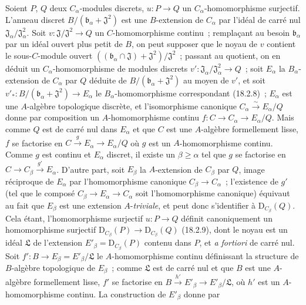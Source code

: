 \begin{env}[19.5.6.1]
\label{0.19.5.6.1-fr}
Soient $P$, $Q$ deux $C_\alpha$-modules discrets,
$u:P\to Q$ un $C_\alpha$-homomorphisme surjectif. L'anneau discret
$B/(\mathfrak b_\alpha+\mathfrak J^2)$ est une $B$-extension de $C_\alpha$ par
l'idéal de carré nul $\mathfrak J_\alpha/\mathfrak J_\alpha^2$. Soit
$v:\mathfrak J/\mathfrak J^2\to Q$ un $C$-homomorphisme continu~; remplaçant
au besoin $\mathfrak b_\alpha$ par un idéal ouvert plus petit de $B$, on peut
supposer que le noyau de $v$ contient le sous-$C$-module ouvert
$((\mathfrak b_\alpha\cap\mathfrak J)+\mathfrak J^2)/\mathfrak J^2$~;
passant au quotient, on en déduit un $C_\alpha$-homomorphisme de modules
discrets $v':\mathfrak J_\alpha/\mathfrak J_\alpha^2\to Q$~; soit
$E_\alpha$ la $B_\alpha$-extension de $C_\alpha$ par $Q$ déduite de
$B/(\mathfrak b_\alpha+\mathfrak J^2)$ au moyen de $v'$, et soit
$v'_*:B/(\mathfrak b_\alpha+\mathfrak J^2)\to E_\alpha$ le
$B_\alpha$-homomorphisme correspondant (18.2.8)~; $E_\alpha$ est une
$A$-algèbre topologique discrète, et l'isomorphisme canonique
$C_\alpha\xrightarrow{\sim}E_\alpha/Q$ donne par composition un
$A$-homomorphisme continu $f:C\to C_\alpha\to E_\alpha/Q$. Mais comme $Q$ est
de carré nul dans $E_\alpha$ et que $C$ est une $A$-algèbre formellement
lisse, $f$ se factorise en $C\xrightarrow{g}E_\alpha\to E_\alpha/Q$ où $g$
est un $A$-homomorphisme continu. Comme $g$ est continu et $E_\alpha$ discret,
il existe un $\beta\geq\alpha$ tel que $g$ se factorise en
$C\to C_\beta\xrightarrow{g'}E_\alpha$. D'autre part, soit $E_\beta$ la
$A$-extension de $C_\beta$ par $Q$, image réciproque de $E_\alpha$ par
l'homomorphisme canonique $C_\beta\to C_\alpha$~; l'existence de $g'$ (tel que
le composé $C_\beta\to E_\alpha\to C_\alpha$ soit l'homomorphisme canonique)
équivaut au fait que $E_\beta$ est une extension $A$-\emph{triviale}, et peut
donc s'identifier à $\mathrm D_{C_\beta}(Q)$. Cela étant, l'homomorphisme
surjectif $u:P\to Q$ définit canoniquement un homomorphisme surjectif
$\mathrm D_{C_\beta}(P)\to\mathrm D_{C_\beta}(Q)$ (18.2.9), dont le noyau est
un idéal $\mathfrak L$ de l'extension $E'_\beta=\mathrm D_{C_\beta}(P)$
contenu dans $P$, et \emph{a fortiori} de carré nul. Soit
$f':B\to E_\beta=E'_\beta/\mathfrak L$ le $A$-homomorphisme continu définissant
la structure de $B$-algèbre topologique de $E_\beta$~; comme $\mathfrak L$ est
de carré nul et que $B$ est une $A$-algèbre formellement lisse, $f'$ se
factorise en $B\xrightarrow{h'}E'_\beta\to E'_\beta/\mathfrak L$, où $h'$ est
un $A$-homomorphisme continu. La construction de $E'_\beta$ donne par

\end{env}
